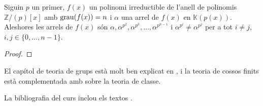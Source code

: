 \documentclass[../Apunts.tex]{subfiles}
\begin{document}
	\begin{theorem}
		Siguin \(p\) un primer, \(f(x)\) un polinomi irreductible de l'anell de polinomis \(\mathbb{Z}/(p)[x]\) amb \(\operatorname{grau}(f(x))=n\) i \(\alpha\) una arrel de \(f(x)\) en \(\mathbb{K}(p(x))\). Aleshores les arrels de \(f(x)\) són \(\alpha,\alpha^{p^{2}},\alpha^{p^{3}},\dots,\alpha^{p^{n-1}}\) i \(\alpha^{p^{i}}\neq\alpha^{p^{j}}\) per a tot \(i\neq j\), \(i,j\in\{0,\dots,n-1\}\).
		\begin{proof}
		\end{proof}
	\end{theorem}
	\printbibliography
	El capítol de teoria de grups està molt ben explicat en \cite{NumerosGruposyAnillos}, i la teoria de cossos finits està complementada amb \cite{AntoineRosaCampsMoncasiIntroduccioAlgebraAbstracta} sobre la teoria de classe.
	
	La bibliografia del curs inclou els textos \cite{AntoineRosaCampsMoncasiIntroduccioAlgebraAbstracta, CedoAlgebraBasica, CohnBasicAlgebra, NumerosGruposyAnillos, FelixConcepcionSebastianIntroduccionAlAlgebra, FraleighFirstCourseAbstractAlgebra, HungerfordAlgebra}.
\end{document}
